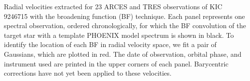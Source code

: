 \label{fig:bffig} Radial velocities extracted for 23 ARCES and TRES observations of KIC 9246715 with the broadening function (BF) technique. Each panel represents one spectral observation, ordered chronologically, for which the BF convolution of the target star with a template PHOENIX model spectrum is shown in black. To identify the location of each BF in radial velocity space, we fit a pair of Gaussians, which are plotted in red. The date of observation, orbital phase, and instrument used are printed in the upper corners of each panel. Barycentric corrections have not yet been applied to these velocities.
  